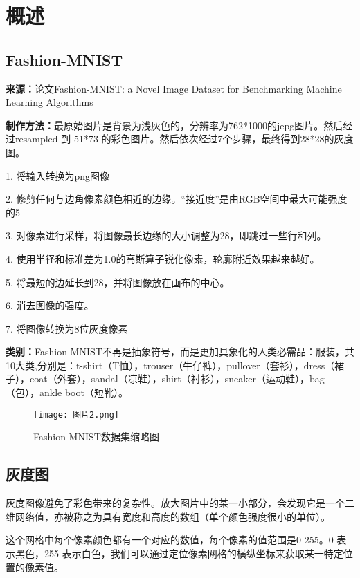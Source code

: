 \documentclass[10.5pt,compsoc,UTF8]{CjC}
\theoremstyle{mystyle}
\begin{document}
\section{\heiti 概述}

\subsection{Fashion-MNIST}
\textbf{来源：}论文Fashion-MNIST: a Novel Image Dataset for Benchmarking Machine Learning Algorithms

\textbf{制作方法：}最原始图片是背景为浅灰色的，分辨率为762*1000的jepg图片。然后经过resampled 到 51*73 的彩色图片。然后依次经过7个步骤，最终得到28*28的灰度图。

1. 将输入转换为png图像

2. 修剪任何与边角像素颜色相近的边缘。“接近度”是由RGB空间中最大可能强度的5%

3. 对像素进行采样，将图像最长边缘的大小调整为28，即跳过一些行和列。

4. 使用半径和标准差为1.0的高斯算子锐化像素，轮廓附近效果越来越好。

5. 将最短的边延长到28，并将图像放在画布的中心。

6. 消去图像的强度。

7. 将图像转换为8位灰度像素

\textbf{类别：}Fashion-MNIST不再是抽象符号，而是更加具象化的人类必需品：服装，共10大类,分别是：t-shirt（T恤），trouser（牛仔裤），pullover（套衫），dress（裙子），coat（外套），sandal（凉鞋），shirt（衬衫），sneaker（运动鞋），bag（包），ankle boot（短靴）。

\begin{figure}[h] %
    \centering %
    \texttt{[image: 图片2.png]} %
    \caption{Fashion-MNIST数据集缩略图} %
\end{figure}

\subsection{灰度图}
灰度图像避免了彩色带来的复杂性。放大图片中的某一小部分，会发现它是一个二维网络值，亦被称之为具有宽度和高度的数组（单个颜色强度很小的单位）。

这个网格中每个像素颜色都有一个对应的数值，每个像素的值范围是0-255。0 表示黑色，255 表示白色，我们可以通过定位像素网格的横纵坐标来获取某一特定位置的像素值。
\end{document}
